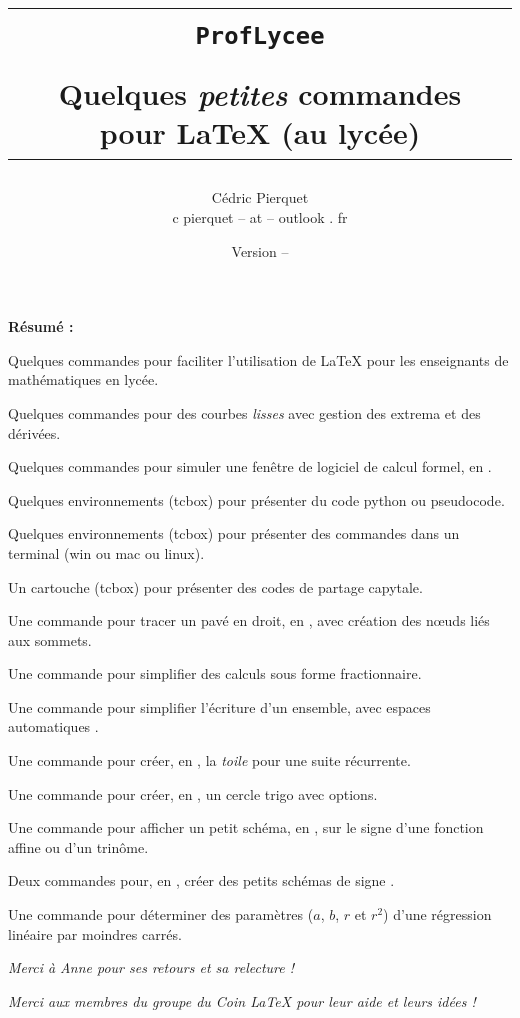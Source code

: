 \documentclass{article}
\title{%
\begin{minipage}{0.75\linewidth}
	\begin{tcolorbox}[colframe=yellow,colback=yellow!15]
		\begin{center}
			\begin{tabular}{c}
				\lstinline!ProfLycee!\\
				\\
				Quelques \textit{petites} commandes pour  \LaTeX{} (au lycée)
			\end{tabular}
		\end{center}
	\end{tcolorbox}
\end{minipage}
}
\author{
	\begin{tabular}{c}
		Cédric Pierquet\\
		{\ttfamily c pierquet -- at -- outlook . fr}
	\end{tabular}
}
\date{Version \PLversion{} -- \PLdate}
\begin{document}
\thispagestyle{empty}

\maketitle

{\Large \bfseries Résumé : }

\medskip

\noindent Quelques commandes pour faciliter l'utilisation de \LaTeX{} pour les enseignants de mathématiques en lycée.

Quelques commandes pour des courbes \textit{lisses} avec gestion des extrema et des dérivées.

Quelques commandes pour simuler une fenêtre de logiciel de calcul formel, en \TikZ.

Quelques environnements (\textsf{tcbox}) pour présenter du code \textsf{python} ou \textsf{pseudocode}.

Quelques environnements (\textsf{tcbox}) pour présenter des commandes dans un terminal (\textsf{win} ou \textsf{mac} ou \textsf{linux}).

Un cartouche (\textsf{tcbox}) pour présenter des codes de partage \textsf{capytale}.

Une commande pour tracer un pavé en droit, en \TikZ, avec création des nœuds liés aux sommets.

Une commande pour simplifier des calculs sous forme fractionnaire.

Une commande pour simplifier l'écriture d'un ensemble, avec espaces \og automatiques \fg.

Une commande pour créer, en \TikZ, la \textit{toile} pour une suite récurrente.

Une commande pour créer, en \TikZ, un cercle trigo avec options.

Une commande pour afficher un petit schéma, en \TikZ, sur le signe d'une fonction affine ou d'un trinôme.

Deux commandes pour, en \TikZ, créer des petits schémas \og de signe \fg.

Une commande pour déterminer des paramètres ($a$, $b$, $r$ et $r^2$) d'une régression linéaire par moindres carrés.

\vspace{1.5cm}

\hfill{}\textit{Merci à Anne pour ses retours et sa relecture !}

\hfill{}\textit{Merci aux membres du groupe \faFacebook{} du \og Coin \LaTeX{} \fg{} pour leur aide et leurs idées !}
\end{document}
